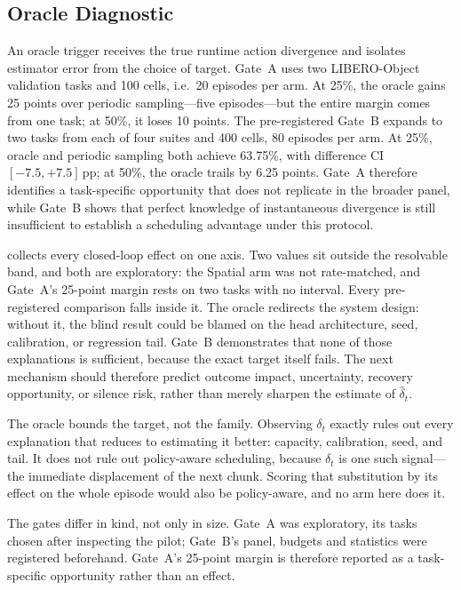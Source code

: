 \documentclass[sigconf,10pt,anonymous,review]{acmart}
\newcommand{\dt}{\delta_t}
\newcommand{\dth}{\hat{\delta}_t}
\newcommand{\pp}{\,pp}
\begin{document}
\subsection{Oracle Diagnostic}
\label{sec:oracle}
An oracle trigger receives the true runtime action divergence and isolates
estimator error from the choice of target. Gate~A uses two LIBERO-Object
validation tasks and 100 cells, i.e.\ 20 episodes per arm. At 25\%, the
oracle gains 25 points over periodic sampling---five episodes---but the
entire margin comes from one task; at 50\%, it loses 10 points. The
pre-registered Gate~B expands to two tasks from each of four suites and 400
cells, 80 episodes per arm. At 25\%, oracle and periodic sampling both
achieve 63.75\%, with difference CI $[-7.5,+7.5]$\pp; at 50\%, the oracle
trails by 6.25 points. Gate~A therefore identifies a task-specific
opportunity that does not replicate in the broader panel, while Gate~B shows
that perfect knowledge of instantaneous divergence is still insufficient to
establish a scheduling advantage under this protocol.

 collects every closed-loop effect on one axis. Two values sit outside the resolvable band, and both are exploratory: the
Spatial arm was not rate-matched, and Gate~A's 25-point margin rests on two tasks with no
interval. Every pre-registered comparison falls inside it. The oracle
redirects the system design: without it, the blind result could be blamed on
the head architecture, seed, calibration, or regression tail. Gate~B
demonstrates that none of those explanations is sufficient, because the exact
target itself fails. The next mechanism should therefore predict outcome impact, uncertainty,
recovery opportunity, or silence risk, rather than merely sharpen the estimate
of $\dth$.

The oracle bounds the target, not the family. Observing $\dt$ exactly rules
out every explanation that reduces to estimating it better: capacity,
calibration, seed, and tail. It does not rule out policy-aware scheduling, because $\dt$ is one such
signal---the immediate displacement of the next chunk. Scoring that substitution by its effect on the whole episode would also be
policy-aware, and no arm here does it.

The gates differ in kind, not only in size. Gate~A was exploratory, its tasks
chosen after inspecting the pilot; Gate~B's panel, budgets and statistics were
registered beforehand. Gate~A's 25-point margin is therefore reported as a task-specific
opportunity rather than an effect.
\end{document}
